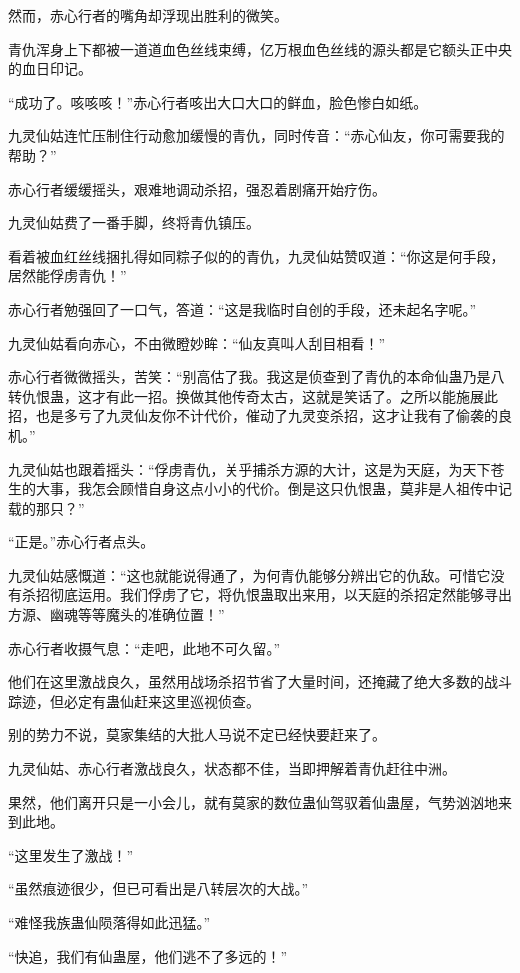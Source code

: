 \begin{this_body}
然而，赤心行者的嘴角却浮现出胜利的微笑。

青仇浑身上下都被一道道血色丝线束缚，亿万根血色丝线的源头都是它额头正中央的血日印记。

“成功了。咳咳咳！”赤心行者咳出大口大口的鲜血，脸色惨白如纸。

九灵仙姑连忙压制住行动愈加缓慢的青仇，同时传音：“赤心仙友，你可需要我的帮助？”

赤心行者缓缓摇头，艰难地调动杀招，强忍着剧痛开始疗伤。

九灵仙姑费了一番手脚，终将青仇镇压。

看着被血红丝线捆扎得如同粽子似的的青仇，九灵仙姑赞叹道：“你这是何手段，居然能俘虏青仇！”

赤心行者勉强回了一口气，答道：“这是我临时自创的手段，还未起名字呢。”

九灵仙姑看向赤心，不由微瞪妙眸：“仙友真叫人刮目相看！”

赤心行者微微摇头，苦笑：“别高估了我。我这是侦查到了青仇的本命仙蛊乃是八转仇恨蛊，这才有此一招。换做其他传奇太古，这就是笑话了。之所以能施展此招，也是多亏了九灵仙友你不计代价，催动了九灵变杀招，这才让我有了偷袭的良机。”

九灵仙姑也跟着摇头：“俘虏青仇，关乎捕杀方源的大计，这是为天庭，为天下苍生的大事，我怎会顾惜自身这点小小的代价。倒是这只仇恨蛊，莫非是人祖传中记载的那只？”

“正是。”赤心行者点头。

九灵仙姑感慨道：“这也就能说得通了，为何青仇能够分辨出它的仇敌。可惜它没有杀招彻底运用。我们俘虏了它，将仇恨蛊取出来用，以天庭的杀招定然能够寻出方源、幽魂等等魔头的准确位置！”

赤心行者收摄气息：“走吧，此地不可久留。”

他们在这里激战良久，虽然用战场杀招节省了大量时间，还掩藏了绝大多数的战斗踪迹，但必定有蛊仙赶来这里巡视侦查。

别的势力不说，莫家集结的大批人马说不定已经快要赶来了。

九灵仙姑、赤心行者激战良久，状态都不佳，当即押解着青仇赶往中洲。

果然，他们离开只是一小会儿，就有莫家的数位蛊仙驾驭着仙蛊屋，气势汹汹地来到此地。

“这里发生了激战！”

“虽然痕迹很少，但已可看出是八转层次的大战。”

“难怪我族蛊仙陨落得如此迅猛。”

“快追，我们有仙蛊屋，他们逃不了多远的！”


\end{this_body}
